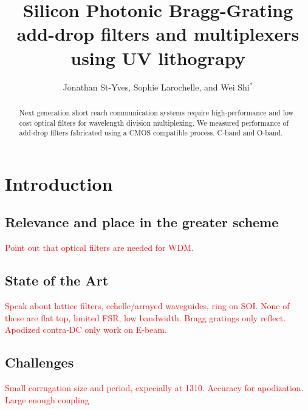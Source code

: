 \documentclass[letterpaper,10pt]{article}
\newcommand\todo[1]{\textcolor{red}{#1}}
\begin{document}
\title{Silicon Photonic Bragg-Grating add-drop filters and multiplexers using UV lithograpy}



\author{Jonathan St-Yves, Sophie Larochelle, and Wei Shi$^*$}
\address{Centre d'optique, photonique et laser (COPL) and Département de génie électrique, Université Laval, 2375 rue de la Terrasse, Québec (Québec), Canada, G1V 0A6}



\begin{abstract}
Next generation short reach communication systems require high-performance and low cost optical filters for wavelength division multiplexing. We measured performance of add-drop filters fabricated using a CMOS compatible process. C-band and O-band.
\end{abstract}



\maketitle


\section{Introduction}
\subsection{Relevance and place in the greater scheme}
\todo{Point out that optical filters are needed for WDM. }

\subsection{State of the Art}
\todo{Speak about lattice filters, echelle/arrayed waveguides, ring on SOI. None of these are flat top, limited FSR, low bandwidth. Bragg gratings only reflect. Apodized contra-DC only work on E-beam.}\cite{xu2006cascaded}

\subsection{Challenges}
\todo{Small corrugation size and period, expecially at 1310. Accuracy for apodization. Large enough coupling}
\end{document}
